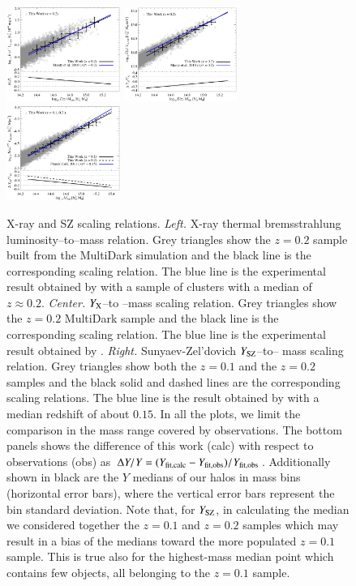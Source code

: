 \documentclass[traditabstract]{aa}
\begin{document}
\begin{figure}[hbt!]
\centering
\includegraphics[width=0.33\textwidth]{figures/lx_m.eps}
\includegraphics[width=0.33\textwidth]{figures/yx_m.eps}
\includegraphics[width=0.33\textwidth]{figures/sz_m.eps}
\caption{X-ray and SZ scaling relations. \emph{Left.} X-ray thermal bremsstrahlung luminosity--to--mass relation. Grey triangles show the $z=0.2$ sample built from the MultiDark simulation and the black line is the corresponding scaling relation. The blue line is the experimental result obtained by \cite{2010MNRAS.406.1773M} with a sample of clusters with a median of $z \approx 0.2$. \emph{Center.} $Y_{\rm{X}}$--to --mass scaling relation. Grey triangles show the $z=0.2$ MultiDark sample and the black line is the corresponding scaling relation. The blue line is the experimental result obtained by \cite{2010MNRAS.406.1773M}. \emph{Right.} Sunyaev-Zel'dovich $Y_{\rm{SZ}}$--to-- mass scaling relation. Grey triangles show both the $z=0.1$ and the $z=0.2$ samples and the black solid and dashed lines are the corresponding scaling relations. The blue line is the result obtained by \cite{2011A&A...536A..11P} with a median redshift of about $0.15$. In all the plots, we limit the comparison in the mass range covered by observations. The bottom panels shows the difference of this work (calc) with respect to observations (obs) as $\Delta Y/Y = (Y_{\rm{fit,calc}}-Y_{\rm{fit,obs}})/Y_{\rm{fit,obs}}$. Additionally shown in black are the $Y$ medians of our halos in mass bins (horizontal error bars), where the vertical error bars represent the bin standard deviation. Note that, for $Y_{\rm{SZ}}$, in calculating the median we considered together the $z=0.1$ and $z=0.2$ samples which may result in a bias of the medians toward the more populated $z=0.1$ sample. This is true also for the highest-mass median point which contains few objects, all belonging to the $z=0.1$ sample.}
\label{fig:X_LM}
\end{figure}
\end{document}
